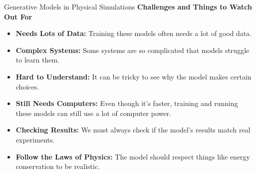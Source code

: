 \begin{frame}[allowframebreaks]{Generative Models in Physical Simulations}
    \framebreak
    \textbf{Challenges and Things to Watch Out For}
    \begin{itemize}
        \item \textbf{Needs Lots of Data:} Training these models often needs a lot of good data.
        \item \textbf{Complex Systems:} Some systems are so complicated that models struggle to learn them.
        \item \textbf{Hard to Understand:} It can be tricky to see why the model makes certain choices.
        \item \textbf{Still Needs Computers:} Even though it's faster, training and running these models can still use a lot of computer power.
        \item \textbf{Checking Results:} We must always check if the model's results match real experiments.
        \item \textbf{Follow the Laws of Physics:} The model should respect things like energy conservation to be realistic.
    \end{itemize}
\end{frame}
